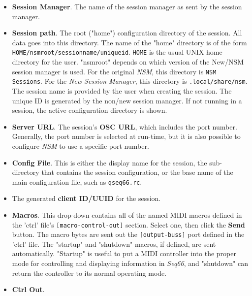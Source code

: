    \begin{itemize}
      \item \textbf{Session Manager}. The name of the session manager as
         sent by the session manager.
      \item \textbf{Session path}.
         The root ("home") configuration directory of the session.
         All data goes into this directory.
         The name of the "home" directory is of the form
         \texttt{HOME/nsmroot/sessionname/uniqueid}.
         \texttt{HOME} is the usual UNIX home directory for the user.
         "nsmroot" depends on which version of the New/NSM session manager is
         used.
         For the original \textsl{NSM}, this directory is \texttt{NSM Sessions}.
         For the \textsl{New Session Manager}, this directory is
         \texttt{.local/share/nsm}.
         The session name is provided by the user when creating the
         session.
         The unique ID is generated by the non/new session manager.
         If not running in a session,
         the active configuration directory is shown.
      \item \textbf{Server URL}.
         The session's \textbf{OSC URL}, which includes the port number.
         Generally, the port number is selected at run-time, but it is also
         possible to configure \textsl{NSM} to use a specific port number.
      \item \textbf{Config File}.
         This is either the display name for the session, the
         sub-directory that contains the session configuration, or
         the base name of the main configuration file,
         such as \texttt{qseq66.rc}.
      \item The generated \textbf{client ID/UUID} for the session.
      \item \textbf{Macros}.
         This drop-down contains all of the named MIDI macros
         defined in the 'ctrl' file's
         \texttt{[macro-control-out]} section.
         Select one, then click the \textbf{Send} button.
         The macro bytes are sent out the
         \texttt{[output-buss]} port defined in the 'ctrl' file.
         The "startup" and "shutdown" macros, if defined,
         are sent automatically. "Startup" is useful to put
         a MIDI controller into the proper mode for controlling and displaying
         information in \textsl{Seq66}, and "shutdown" can return the controller
         to its normal operating mode.
      \item \textbf{Ctrl Out}.

\end{itemize}
